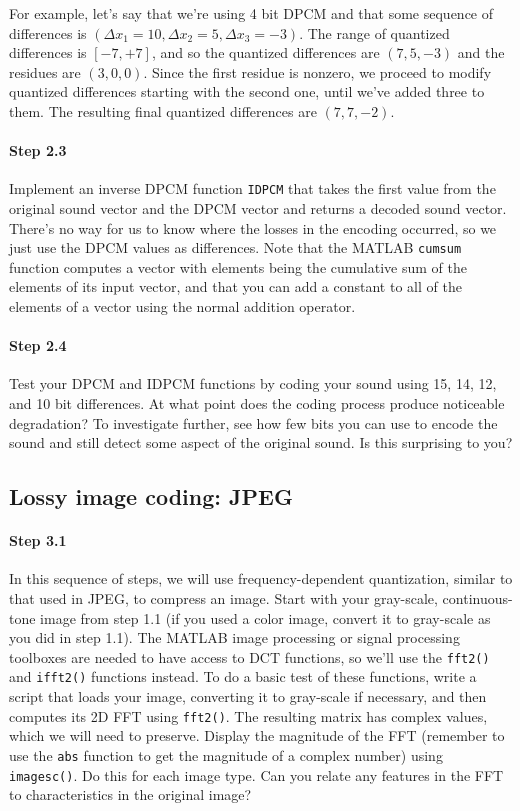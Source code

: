 For example, let's say that we're using 4 bit DPCM and that some
sequence of differences is $(\Delta x_1=10, \Delta x_2=5, \Delta
x_3=-3)$. The range of quantized differences is $[-7, +7]$, and so the
quantized differences are $(7, 5, -3)$ and the residues are $(3, 0,
0)$. Since the first residue is nonzero, we proceed to modify quantized
differences starting with the second one, until we've added three to
them. The resulting final quantized differences are $(7, 7, -2)$.

\paragraph{Step 2.3} Implement an inverse DPCM function \verb|IDPCM|
that takes the first value from the original sound vector and the DPCM
vector and returns a decoded sound vector. There's no way for us to
know where the losses in the encoding occurred, so we just use the
DPCM values as differences. Note that the MATLAB \verb|cumsum|
function computes a vector with elements being the cumulative sum of
the elements of its input vector, and that you can add a constant to
all of the elements of a vector using the normal addition operator.

\paragraph{Step 2.4} Test your DPCM and IDPCM functions by coding your
sound using 15, 14, 12, and 10 bit differences. At what point does the
coding process produce noticeable degradation? To investigate further,
see how few bits you can use to encode the sound and still detect some
aspect of the original sound. Is this surprising to you?

\subsection{Lossy image coding: JPEG}

\paragraph{Step 3.1} In this sequence of steps, we will use
frequency-dependent quantization, similar to that used in JPEG, to
compress an image. Start with your gray-scale, continuous-tone image
from step 1.1 (if you used a color image, convert it to gray-scale as
you did in step 1.1). The MATLAB image processing or signal processing
toolboxes are needed to have access to DCT functions, so we'll use the
\verb|fft2()| and \verb|ifft2()| functions instead. To do a basic test
of these functions, write a script that loads your image, converting
it to gray-scale if necessary, and then computes its 2D FFT using
\verb|fft2()|. The resulting matrix has complex values, which we will
need to preserve. Display the magnitude of the FFT (remember to use
the \verb|abs| function to get the magnitude of a complex number)
using \verb|imagesc()|. Do this for each image type.  Can you relate
any features in the FFT to characteristics in the original image?

